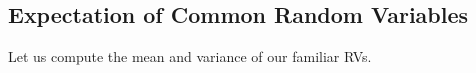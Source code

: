 

\subsection{Expectation of Common Random Variables}

Let us compute the mean and variance of our familiar RVs.

